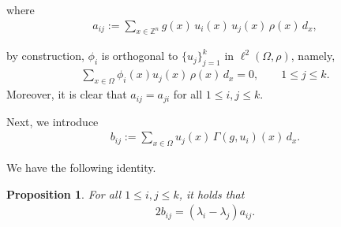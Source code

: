 \documentclass[11pt]{article}
\newtheorem{proposition}[theorem]{Proposition}
\theoremstyle{definition}
\theoremstyle{remark}
\numberwithin{equation}{section}
\begin{document}
where
\begin{align*}
a_{ij} := \sum_{x \in \mathbb{Z}^n} g(x)\, u_i(x)\, u_j(x)\, \rho(x)\, d_x,
\end{align*}\par\noindent
by construction, $\phi_i$ is orthogonal to $\{u_j\}_{j=1}^k$ in $\ell^2(\Omega,\rho)$, namely,
\begin{align*}
\sum_{x \in \Omega} \phi_i(x) u_j(x)\, \rho(x)\, d_x = 0,
\qquad 1 \le j \le k.
\end{align*}
Moreover, it is clear that $a_{ij} = a_{ji}$ for all $1 \le i,j \le k$.
\par\noindent
Next, we introduce
\begin{align*}
b_{ij} := \sum_{x \in \Omega} u_j(x)\, \Gamma(g,u_i)(x)\, d_x.
\end{align*}
\par
We have the following identity.

\begin{proposition}
For all $1 \le i,j \le k$, it holds that
\begin{align}
2 b_{ij} = (\lambda_i - \lambda_j) a_{ij}.
\end{align}
\end{proposition}
\end{document}
